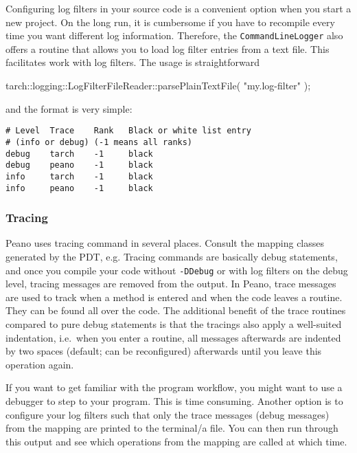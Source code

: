 Configuring log filters in your source code is a convenient option when you
start a new project.
On the long run, it is cumbersome if you have to recompile every time you want
different log information.
Therefore, the \texttt{CommandLineLogger} also offers a routine that allows you
to load log filter entries from a text file.
This facilitates work with log filters.
The usage is straightforward
\begin{code}
tarch::logging::LogFilterFileReader::parsePlainTextFile( "my.log-filter" );
\end{code}

\noindent
and the format is very simple:
\begin{verbatim}
# Level  Trace    Rank   Black or white list entry
# (info or debug) (-1 means all ranks)
debug    tarch    -1     black
debug    peano    -1     black
info     tarch    -1     black
info     peano    -1     black
\end{verbatim}




\subsubsection{Tracing}

Peano uses tracing command in several places. 
Consult the mapping classes generated by the PDT, e.g. 
Tracing commands are basically debug statements, and once you compile your code
without \texttt{-DDebug} or with log filters on the debug level, tracing
messages are removed from the output.
In Peano, trace messages are used to track when a method is entered and when the
code leaves a routine.
They can be found all over the code.
The additional benefit of the trace routines compared to pure debug statements
is that the tracings also apply a well-suited indentation, i.e.~when you enter a
routine, all messages afterwards are indented by two spaces (default; can be
reconfigured) afterwards until you leave this operation again.


\begin{remark}
If you want to get familiar with the program workflow, you might want to use a
debugger to step to your program.
This is time consuming.
Another option is to configure your log filters such that only the trace
messages (debug messages) from the mapping are printed to the terminal/a file.
You can then run through this output and see which operations from the mapping
are called at which time.
\end{remark}








